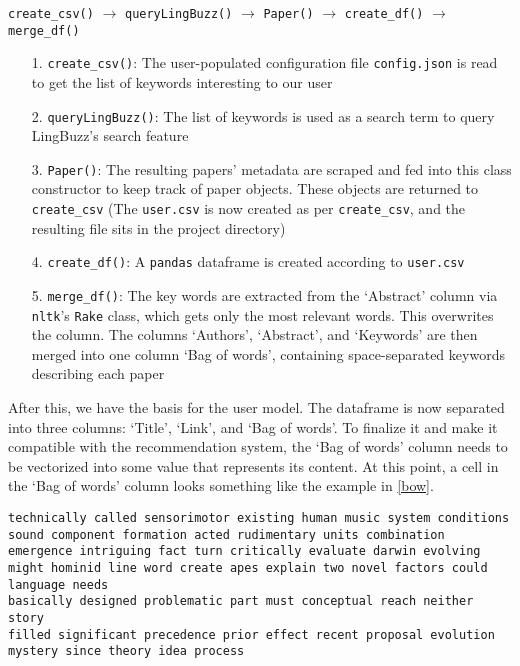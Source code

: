 \documentclass{article}
\begin{document}
\begin{exe}
\ex
\label{model}
\texttt{create\_csv()} $\rightarrow$ \texttt{queryLingBuzz()} $\rightarrow$ \texttt{Paper()} $\rightarrow$ \texttt{create\_df()} $\rightarrow$ \texttt{merge\_df()}
\begin{itemize}
    \item [1.] \texttt{create\_csv()}: The user-populated configuration file \texttt{config.json} is read to get the list of keywords interesting to our user
    \item [2.] \texttt{queryLingBuzz()}: The list of keywords is used as a search term to query LingBuzz's search feature
    \item [3.] \texttt{Paper()}: The resulting papers' metadata are scraped and fed into this class constructor to keep track of paper objects. These objects are returned to \texttt{create\_csv} (The \texttt{user.csv} is now created as per \texttt{create\_csv}, and the resulting file sits in the project directory)
    \item [4.] \texttt{create\_df()}: A \texttt{pandas} dataframe is created according to \texttt{user.csv}
    \item [5.] \texttt{merge\_df()}: The key words are extracted from the `Abstract' column via \texttt{nltk}'s \texttt{Rake} class, which gets only the most relevant words. This overwrites the column. The columns `Authors', `Abstract', and `Keywords' are then merged into one column `Bag of words', containing space-separated keywords describing each paper
\end{itemize}
\end{exe}

After this, we have the basis for the user model. The dataframe is now separated into three columns: `Title', `Link', and `Bag of words'. To finalize it and make it compatible with the recommendation system, the `Bag of words' column needs to be vectorized into some value that represents its content. At this point, a cell in the `Bag of words' column looks something like the example in \ref{bow}. 

\begin{exe}
\ex
\label{bow}
\texttt{technically called sensorimotor existing human music system conditions sound component formation acted rudimentary units combination emergence intriguing fact turn critically evaluate darwin evolving might hominid line word create apes explain two novel factors could language needs \\ basically designed problematic part must conceptual reach neither story \\ filled significant precedence prior effect recent proposal evolution \\ mystery since theory idea process}

\end{exe}
\end{document}
